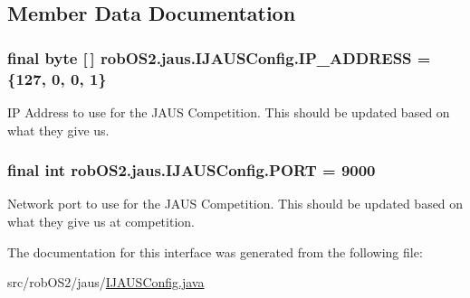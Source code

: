 \subsection{Member Data Documentation}
\hypertarget{interfacerob_o_s2_1_1jaus_1_1_i_j_a_u_s_config_a19c69476ca2c0cac980e6a36b01dd236}{
\subsubsection[{IP\_\-ADDRESS}]{\setlength{\rightskip}{0pt plus 5cm}final byte \mbox{[}$\,$\mbox{]} {\bf robOS2.jaus.IJAUSConfig.IP\_\-ADDRESS} = \{127, 0, 0, 1\}}}
\label{interfacerob_o_s2_1_1jaus_1_1_i_j_a_u_s_config_a19c69476ca2c0cac980e6a36b01dd236}
IP Address to use for the JAUS Competition. This should be updated based on what they give us. \hypertarget{interfacerob_o_s2_1_1jaus_1_1_i_j_a_u_s_config_a8e37b52931fe576a44a7882d3b4f5c53}{
\subsubsection[{PORT}]{\setlength{\rightskip}{0pt plus 5cm}final int {\bf robOS2.jaus.IJAUSConfig.PORT} = 9000}}
\label{interfacerob_o_s2_1_1jaus_1_1_i_j_a_u_s_config_a8e37b52931fe576a44a7882d3b4f5c53}
Network port to use for the JAUS Competition. This should be updated based on what they give us at competition. 

The documentation for this interface was generated from the following file:\begin{DoxyCompactItemize}
\item 
src/robOS2/jaus/\hyperlink{_i_j_a_u_s_config_8java}{IJAUSConfig.java}\end{DoxyCompactItemize}

